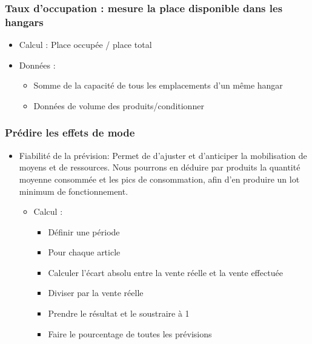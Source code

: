 \subsubsection{Taux d’occupation : mesure la place disponible dans les hangars} 

\begin{itemize}

	\item Calcul : Place occupée / place total 
	
	\item Données : 
	
	\begin{itemize}
	
		\item Somme de la capacité de tous les emplacements d’un même hangar  
		
		\item Données de volume des produits/conditionner 
		
	\end{itemize}

\end{itemize}

\vertspace

\subsubsection{Prédire les effets de mode}

\begin{itemize}

	\item Fiabilité de la prévision: Permet de d’ajuster et d’anticiper la mobilisation de moyens et de ressources. Nous pourrons en déduire par produits la quantité moyenne consommée et les pics de consommation, afin d’en produire un lot minimum de fonctionnement. 
	
		\begin{itemize}
		
			\item Calcul : 
			
				\begin{itemize}
				
					\item Définir une période  

					\item Pour chaque article 

					\item Calculer l’écart absolu entre la vente réelle et la vente effectuée 

					\item Diviser par la vente réelle 

					\item Prendre le résultat et le soustraire à 1 

					\item Faire le pourcentage de toutes les prévisions 				
				
				\end{itemize}						
		
		\end{itemize}

\end{itemize}


